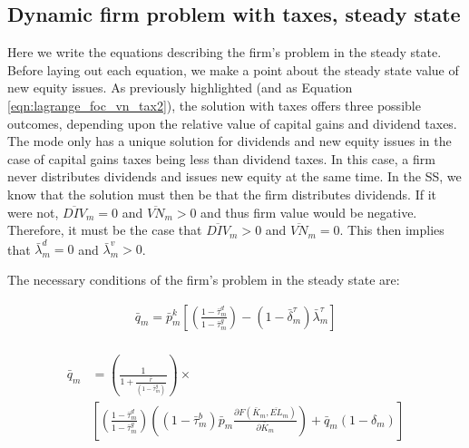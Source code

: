 \documentclass[letterpaper,12pt]{article}
\theoremstyle{definition}
\begin{document}
\begin{spacing}{1.5}
\subsection*{Dynamic firm problem with taxes, steady state}

Here we write the equations describing the firm's problem in the steady state.  Before laying out each equation, we make a point about the steady state value of new equity issues.  As previously highlighted (and as Equation \ref{eqn:lagrange_foc_vn_tax2}), the solution with taxes offers three possible outcomes, depending upon the relative value of capital gains and dividend taxes.  The mode only has a unique solution for dividends and new equity issues in the case of capital gains taxes being less than dividend taxes.  In this case, a firm never distributes dividends and issues new equity at the same time.  In the SS, we know that the solution must then be that the firm distributes dividends.  If it were not, $\overline{DIV}_{m}=0$ and $\overline{VN}_{m}>0$ and thus firm value would be negative.  Therefore, it must be the case that $\overline{DIV}_{m}>0$ and $\overline{VN}_{m}=0$.  This then implies that $\bar{\lambda}^{d}_{m}=0$ and $\bar{\lambda}^{v}_{m}>0$.



The necessary conditions of the firm's problem in the steady state are:

\begin{equation}
\label{eqn:lagrange_foc_i_tax_ss}
\begin{split}
  \bar{q}_{m} = \bar{p}^{k}_{m}\left[\left(\frac{1-\bar{\tau}^{d}_{m}}{1-\bar{\tau}^{g}_{m}}\right) - (1-\bar{\delta}^{\tau}_{m})\bar{\lambda}^{\tau}_{m} \right]  \\
\end{split}
\end{equation}


\begin{equation}
\label{eqn:lagrange_foc_k_tax_ss}
\begin{split}
 \bar{q}_{m} &=  \left(\frac{1}{1+\frac{\bar{r}}{(1-\bar{\tau}^{g}_{m})}}\right) \times  \\
& \left[\left(\frac{1-\bar{\tau}^{d}_{m}}{1-\bar{\tau}^{g}_{m}}\right)\left((1-\bar{\tau}^{b}_{m})\bar{p}_{m}\frac{\partial F(\bar{K}_{m},\overline{EL}_{m})}{\partial \bar{K}_{m}}\right) + \bar{q}_{m}(1-\delta_{m}) \right]  \\
\end{split}
\end{equation}


\end{spacing}
\end{document}
